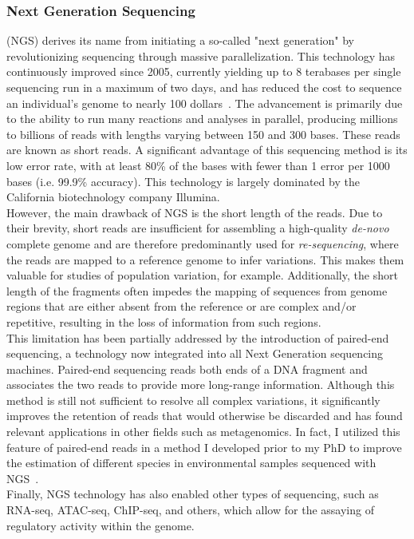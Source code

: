 \subsubsection{Next Generation Sequencing} (\gls{NGS}) derives its name from initiating a so-called "next generation" by revolutionizing sequencing through massive parallelization. This technology has continuously improved since 2005, currently yielding up to 8 terabases per single sequencing run in a maximum of two days, and has reduced the cost to sequence an individual's genome to nearly 100 dollars~\cite{100dollars}. The advancement is primarily due to the ability to run many reactions and analyses in parallel, producing millions to billions of reads with lengths varying between 150 and 300 bases. These reads are known as short reads. A significant advantage of this sequencing method is its low error rate, with at least 80\% of the bases with fewer than 1 error per 1000 bases (i.e. 99.9\% accuracy). This technology is largely dominated by the California biotechnology company Illumina.\\
However, the main drawback of NGS is the short length of the reads. Due to their brevity, short reads are insufficient for assembling a high-quality \emph{de-novo} complete genome and are therefore predominantly used for \emph{re-sequencing}, where the reads are mapped to a reference genome to infer variations. This makes them valuable for studies of population variation, for example. Additionally, the short length of the fragments often impedes the mapping of sequences from genome regions that are either absent from the reference or are complex and/or repetitive, resulting in the loss of information from such regions.\\
This limitation has been partially addressed by the introduction of paired-end sequencing, a technology now integrated into all Next Generation sequencing machines. Paired-end sequencing reads both ends of a DNA fragment and associates the two reads to provide more long-range information. Although this method is still not sufficient to resolve all complex variations, it significantly improves the retention of reads that would otherwise be discarded and has found relevant applications in other fields such as metagenomics. In fact, I utilized this feature of paired-end reads in a method I developed prior to my PhD to improve the estimation of different species in environmental samples sequenced with NGS~\cite{metaprob2}. \\
Finally, NGS technology has also enabled other types of sequencing, such as RNA-seq, ATAC-seq, ChIP-seq, and others, which allow for the assaying of regulatory activity within the genome.

